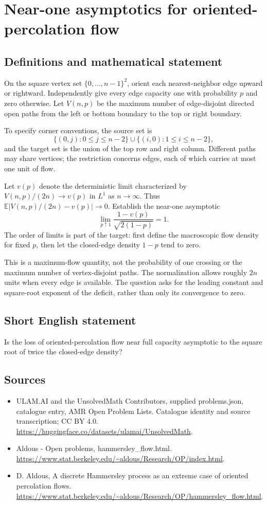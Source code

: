 \documentclass[11pt,a4paper]{article}
\begin{document}
\section*{Near-one asymptotics for oriented-percolation flow}\label{statement}

\subsection{Definitions and mathematical statement}
On the square vertex set $\{0,\ldots,n-1\}^2$, orient each nearest-neighbor edge upward or rightward. Independently give every edge capacity one with probability $p$ and zero otherwise. Let $V(n,p)$ be the maximum number of edge-disjoint directed open paths from the left or bottom boundary to the top or right boundary.

To specify corner conventions, the source set is
\[
\{(0,j):0\le j\le n-2\}\cup\{(i,0):1\le i\le n-2\},
\]
and the target set is the union of the top row and right column. Different paths may share vertices; the restriction concerns edges, each of which carries at most one unit of flow.

Let $v(p)$ denote the deterministic limit characterized by $V(n,p)/(2n)\to v(p)$ in $L^1$ as $n\to\infty$. Thus $\mathbb E|V(n,p)/(2n)-v(p)|\to0$. Establish the near-one asymptotic
\[
\lim_{p\uparrow1}\frac{1-v(p)}{\sqrt{2(1-p)}}=1.
\]
The order of limits is part of the target: first define the macroscopic flow density for fixed $p$, then let the closed-edge density $1-p$ tend to zero.

This is a maximum-flow quantity, not the probability of one crossing or the maximum number of vertex-disjoint paths. The normalization allows roughly $2n$ units when every edge is available. The question asks for the leading constant and square-root exponent of the deficit, rather than only its convergence to zero.
\subsection{Short English statement}
Is the loss of oriented-percolation flow near full capacity asymptotic to the square root of twice the closed-edge density?
\subsection{Sources}
\begin{itemize}
\item[S1] ULAM.AI and the UnsolvedMath Contributors, supplied problems.json, catalogue entry, AMR Open Problem Lists. Catalogue identity and source transcription; CC BY 4.0.
\url{https://huggingface.co/datasets/ulamai/UnsolvedMath}.
\item[S2] Aldous - Open problems, hammersley\_flow.html. 
\url{https://www.stat.berkeley.edu/~aldous/Research/OP/index.html}.
\item[S3] D. Aldous, A discrete Hammersley process as an extreme case of oriented percolation flows.
\url{https://www.stat.berkeley.edu/~aldous/Research/OP/hammersley_flow.html}.
\end{itemize}
\end{document}

